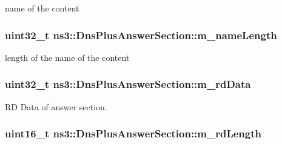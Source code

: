 name of the content 

\hypertarget{classns3_1_1DnsPlusAnswerSection_ac7759da5ffc094ed4d0e60d7095ed1d2}{
\subsubsection[{m\-\_\-name\-Length}]{\setlength{\rightskip}{0pt plus 5cm}uint32\-\_\-t ns3\-::\-Dns\-Plus\-Answer\-Section\-::m\-\_\-name\-Length\hspace{0.3cm}{\ttfamily [private]}}}\label{classns3_1_1DnsPlusAnswerSection_ac7759da5ffc094ed4d0e60d7095ed1d2}


length of the name of the content 

\hypertarget{classns3_1_1DnsPlusAnswerSection_ab02f72df4dd55bc16b58c4915e7bc0ce}{
\subsubsection[{m\-\_\-rd\-Data}]{\setlength{\rightskip}{0pt plus 5cm}uint32\-\_\-t ns3\-::\-Dns\-Plus\-Answer\-Section\-::m\-\_\-rd\-Data\hspace{0.3cm}{\ttfamily [private]}}}\label{classns3_1_1DnsPlusAnswerSection_ab02f72df4dd55bc16b58c4915e7bc0ce}


R\-D Data of answer section. 

\hypertarget{classns3_1_1DnsPlusAnswerSection_a87bd32bf4be3b0d809014553260f5abb}{
\subsubsection[{m\-\_\-rd\-Length}]{\setlength{\rightskip}{0pt plus 5cm}uint16\-\_\-t ns3\-::\-Dns\-Plus\-Answer\-Section\-::m\-\_\-rd\-Length\hspace{0.3cm}{\ttfamily [private]}}}\label{classns3_1_1DnsPlusAnswerSection_a87bd32bf4be3b0d809014553260f5abb}



